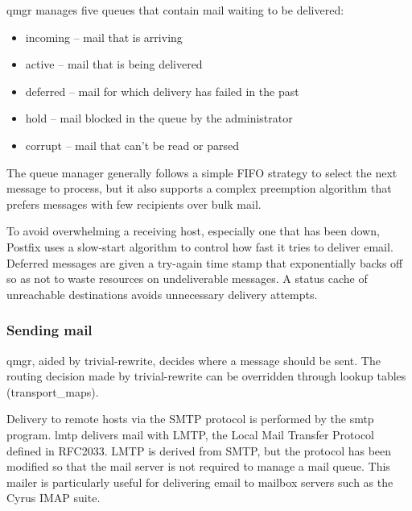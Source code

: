 \protect\hypertarget{part0026_split_058.htmlux5cux23_idIndexMarker2689}{}{}\protect\hypertarget{part0026_split_058.htmlux5cux23_idIndexMarker2690}{}{}{qmgr}
manages five queues that contain mail waiting to be delivered:

\begin{itemize}
\item
  {incoming} -- mail that is arriving
\item
  {active} -- mail that is being delivered
\item
  {deferred} -- mail for which delivery has failed in the past
\item
  {hold} -- mail blocked in the queue by the administrator
\item
  {corrupt} -- mail that can't be read or parsed
\end{itemize}

The queue manager generally follows a simple FIFO strategy to select the
next message to process, but it also supports a complex preemption
algorithm that prefers messages with few recipients over bulk mail.

To avoid overwhelming a receiving host, especially one that has been
down, Postfix uses a slow-start algorithm to control how fast it tries
to deliver email. Deferred messages are given a try-again time stamp
that exponentially backs off so as not to waste resources on
undeliverable messages. A status cache of unreachable destinations
avoids unnecessary delivery attempts.

\subsubsection[Sending
mail]{\texorpdfstring{\protect\hypertarget{part0026_split_058.htmlux5cux23_idTextAnchor1169}{}{}Sending
mail}{Sending mail}}

\protect\hypertarget{part0026_split_058.htmlux5cux23_idIndexMarker2691}{}{}{qmgr},
aided by {trivial-rewrite}, decides where a message should be sent. The
routing decision made by {trivial-rewrite }can be overridden through
lookup tables ({transport\_maps}).

Delivery to remote hosts via the SMTP protocol is performed by the
{smtp} program.
\protect\hypertarget{part0026_split_058.htmlux5cux23_idIndexMarker2692}{}{}{lmtp}
delivers mail with
\protect\hypertarget{part0026_split_058.htmlux5cux23_idIndexMarker2693}{}{}\protect\hypertarget{part0026_split_058.htmlux5cux23_idIndexMarker2694}{}{}LMTP,
the Local Mail Transfer Protocol defined in RFC2033. LMTP is derived
from SMTP, but the protocol has been modified so that the mail server is
not required to manage a mail queue. This mailer is particularly useful
for delivering email to mailbox servers such as the Cyrus IMAP suite.

